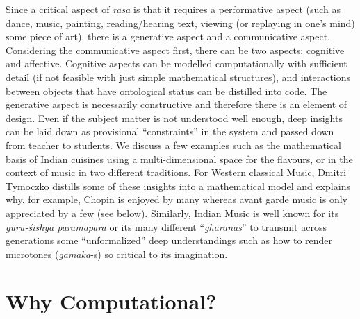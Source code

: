 Since a critical aspect of \textsl{rasa} is that it requires a performative aspect (such as dance, music, painting, reading/hearing text, viewing (or replaying in one’s mind) some piece of art), there is a generative aspect and a communicative aspect. Considering the communicative aspect first, there can be two aspects: cognitive and affective. Cognitive aspects can be modelled computationally with sufficient detail (if not feasible with just simple mathematical structures), and interactions between objects that have ontological status can be distilled into code. The generative aspect is necessarily constructive and therefore there is an element of design. Even if the subject matter is not understood well enough, deep insights can be laid down as provisional “constraints” in the system and passed down from teacher to students. We discuss a few examples such as the mathematical basis of Indian cuisines using a multi-dimensional space for the flavours, or in the context of music in two different traditions. For Western classical Music, Dmitri Tymoczko distills some of these insights into a mathematical model and explains why, for example, Chopin is enjoyed by many whereas avant garde music is only appreciated by a few (see below). Similarly, Indian Music is well known for its \textsl{guru-śishya paramapara} or its many different “\textsl{gharānas}” to transmit across generations some “unformalized” deep understandings such as how to render microtones (\textsl{gamaka}-s) so critical to its imagination.\\[-20pt] 

\section*{Why Computational?}

